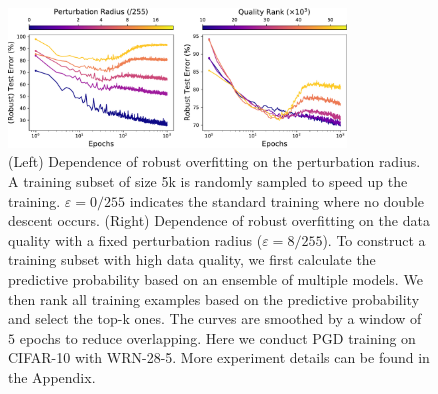     \begin{figure}[!ht]
      \centering
      \includegraphics[width=0.8\textwidth]{figures/dependence-perturbation-quality.pdf}
      \caption{(Left) Dependence of robust overfitting on the perturbation radius. A training subset of size 5k is randomly sampled to speed up the training.
      $\varepsilon = 0/255$ indicates the standard training where no double descent occurs. 
      (Right) Dependence of robust overfitting on the data quality with a fixed perturbation radius ($\varepsilon = 8/255$). To construct a training subset with high data quality, we first calculate the predictive probability based on an ensemble of multiple models. We then rank all training examples based on the predictive probability and select the top-k ones.
      The curves are smoothed by a window of $5$ epochs to reduce overlapping.
      Here we conduct PGD training on CIFAR-10 with WRN-28-5. 
      More experiment details can be found in the Appendix. %
      }
      \vspace{-1em}
    \label{fig:dependence-perturbation-quality}
    \end{figure}